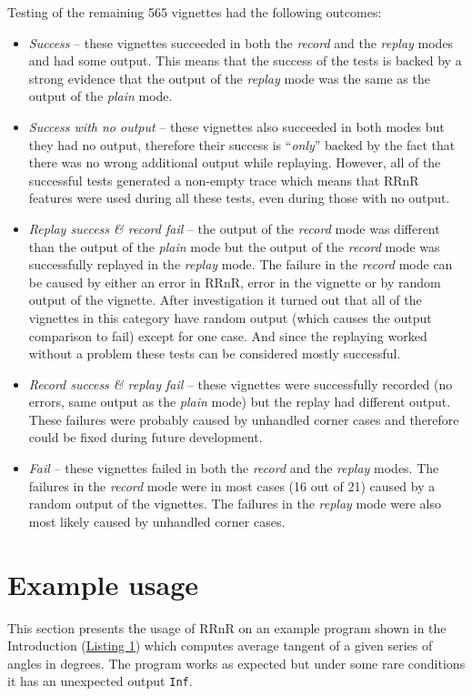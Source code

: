 \documentclass[thesis=M,english,hidelinks]{FITthesis}[2012/10/20]
\newcommand*{\qt}[1]{\enquote{{\itshape#1}}}
\begin{document}
	Testing of the remaining 565 vignettes had the following outcomes:
	\begin{itemize}
		\item \emph{Success} -- these vignettes succeeded in both the \emph{record} and the \emph{replay} modes and had some output. This means that the success of the tests is backed by a strong evidence that the output of the \emph{replay} mode was the same as the output of the \emph{plain} mode.
		
		\item \emph{Success with no output} -- these vignettes also succeeded in both modes but they had no output, therefore their success is \qt{only} backed by the fact that there was no wrong additional output while replaying. However, all of the successful tests generated a non-empty trace which means that RRnR features were used during all these tests, even during those with no output.
		
		\item \emph{Replay success \& record fail} -- the output of the \emph{record} mode was different than the output of the \emph{plain} mode but the output of the \emph{record} mode was successfully replayed in the \emph{replay} mode. The failure in the \emph{record} mode can be caused by either an error in RRnR, error in the vignette or by random output of the vignette. After investigation it turned out that all of the vignettes in this category have random output (which causes the output comparison to fail) except for one case. And since the replaying worked without a problem these tests can be considered mostly successful.
		
		\item \emph{Record success \& replay fail} -- these vignettes were successfully recorded (no errors, same output as the \emph{plain} mode) but the replay had different output. These failures were probably caused by unhandled corner cases and therefore could be fixed during future development.
		
		\item \emph{Fail} -- these vignettes failed in both the \emph{record} and the \emph{replay} modes. The failures in the \emph{record} mode were in most cases (16 out of 21) caused by a random output of the vignettes. The failures in the \emph{replay} mode were also most likely caused by unhandled corner cases.
	\end{itemize}

	\section{Example usage}
	This section presents the usage of RRnR on an example program shown in the Introduction (\hyperref[example_program]{Listing 1}) which computes average tangent of a given series of angles in degrees. The program works as expected but under some rare conditions it has an unexpected output \lstinline|Inf|.\par
	
\end{document}
